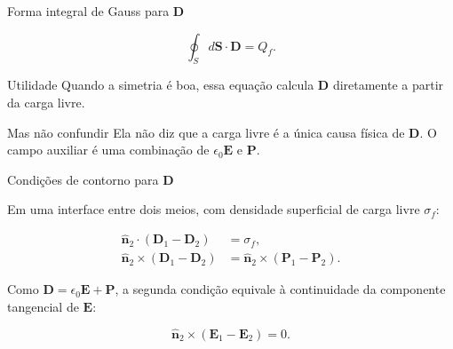\documentclass[aspectratio=169]{beamer}
\begin{document}
\begin{frame}{Forma integral de Gauss para \(\mathbf D\)}

\begin{eqbox}
\begin{equation}
\oint_S d\mathbf S\cdot\mathbf D
=
Q_f.
\tag{6.29}
\label{eq:gauss-D-integral}
\end{equation}
\end{eqbox}

\begin{mybox}{Utilidade}
Quando a simetria é boa, essa equação calcula \(\mathbf D\) diretamente a partir
da carga livre.
\end{mybox}

\begin{alertblock}{Mas não confundir}
Ela não diz que a carga livre é a única causa física de \(\mathbf D\). O campo
auxiliar é uma combinação de \(\epsilon_0\mathbf E\) e \(\mathbf P\).
\end{alertblock}

\end{frame}

\begin{frame}{Condições de contorno para \(\mathbf D\)}

\small

Em uma interface entre dois meios, com densidade superficial de carga livre
\(\sigma_f\):

\begin{eqbox}
\begin{align}
\hat{\mathbf n}_2\cdot(\mathbf D_1-\mathbf D_2)
&=
\sigma_f,
\tag{6.31}
\label{eq:bc-D-normal}
\\
\hat{\mathbf n}_2\times(\mathbf D_1-\mathbf D_2)
&=
\hat{\mathbf n}_2\times(\mathbf P_1-\mathbf P_2).
\tag{6.32}
\label{eq:bc-D-tangencial}
\end{align}
\end{eqbox}

Como \(\mathbf D=\epsilon_0\mathbf E+\mathbf P\), a segunda condição equivale à
continuidade da componente tangencial de \(\mathbf E\):

\begin{eqbox}
\begin{equation}
\hat{\mathbf n}_2\times(\mathbf E_1-\mathbf E_2)=0.
\tag{6.33}
\label{eq:bc-E-tangencial}
\end{equation}
\end{eqbox}

\end{frame}
\end{document}
